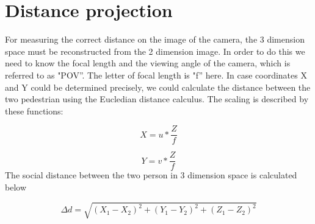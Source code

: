 \section{Distance projection}
For measuring the correct distance on the image of the camera, the 3 dimension space must be reconstructed from the 2 dimension image.  In order to do this we need to know the focal length and the viewing angle of the camera, which is referred to as "POV”. The letter of focal length is "f” here. In case coordinates X and Y could be determined precisely, we could calculate the distance between the two pedestrian using the Eucledian distance calculus. The scaling is described by these functions:

\begin{equation}
    X = u*\frac{Z}{f}
\end{equation}

\begin{equation}
    Y = v*\frac{Z}{f}
\end{equation}
The social distance between the two person in 3 dimension space is calculated below

\begin{equation}
    \Delta d=\sqrt{(X_{1}-X_{2})^2 + (Y_{1}-Y_{2})^2+(Z_{1}-Z_{2})^2}
\end{equation}


